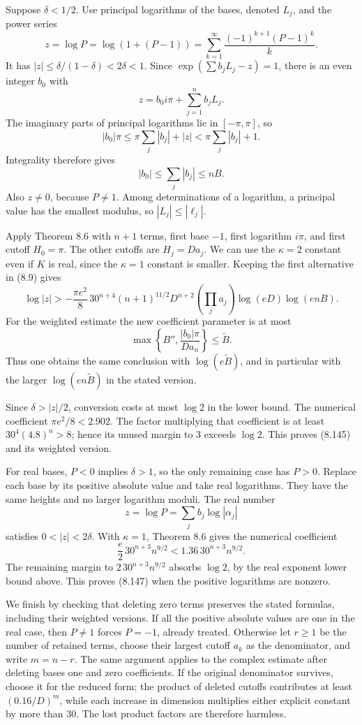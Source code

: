\documentclass[
  11pt,
  a4paper,
]{article}
\begin{document}
Suppose \(\delta<1/2\). Use principal logarithms of the bases, denoted
\(L_j\), and the power series \[
z=\log P=\log(1+(P-1))
=\sum_{k=1}^\infty\frac{(-1)^{k+1}(P-1)^k}{k}.
\] It has \(|z|\le\delta/(1-\delta)<2\delta<1\). Since
\(\exp(\sum b_jL_j-z)=1\), there is an even integer \(b_0\) with \[
z=b_0i\pi+\sum_{j=1}^n b_jL_j.
\] The imaginary parts of principal logarithms lie in \([-\pi,\pi]\), so
\[
|b_0|\pi\le\pi\sum_j|b_j|+|z|
<\pi\sum_j|b_j|+1.
\] Integrality therefore gives \[
|b_0|\le\sum_j|b_j|\le nB. \tag{8.148}
\] Also \(z\ne0\), because \(P\ne1\). Among determinations of a
logarithm, a principal value has the smallest modulus, so
\(|L_j|\le|\ell_j|\).

Apply Theorem 8.6 with \(n+1\) terms, first base \(-1\), first logarithm
\(i\pi\), and first cutoff \(H_0=\pi\). The other cutoffs are
\(H_j=D a_j\). We can use the \(\kappa=2\) constant even if \(K\) is
real, since the \(\kappa=1\) constant is smaller. Keeping the first
alternative in (8.9) gives \[
\log|z|>
-\frac{\pi e^2}{8}\,
30^{n+4}(n+1)^{11/2}D^{n+2}
\left(\prod_j a_j\right)\log(eD)\log(enB).
\] For the weighted estimate the new coefficient parameter is at most \[
\max\left\{B'',\frac{|b_0|\pi}{D a_n}\right\}
\le\widetilde B.
\] Thus one obtains the same conclusion with \(\log(e\widetilde B)\),
and in particular with the larger \(\log(en\widetilde B)\) in the stated
version.

Since \(\delta>|z|/2\), conversion costs at most \(\log2\) in the lower
bound. The numerical coefficient \(\pi e^2/8<2.902\). The factor
multiplying that coefficient is at least \(30^4(4.8)^n>8\); hence its
unused margin to \(3\) exceeds \(\log2\). This proves (8.145) and its
weighted version.

For real bases, \(P<0\) implies \(\delta>1\), so the only remaining case
has \(P>0\). Replace each base by its positive absolute value and take
real logarithms. They have the same heights and no larger logarithm
moduli. The real number \[
z=\log P=\sum_j b_j\log|\alpha_j|
\] satisfies \(0<|z|<2\delta\). With \(\kappa=1\), Theorem 8.6 gives the
numerical coefficient \[
\frac e2\,30^{n+3}n^{9/2}<1.36\,30^{n+3}n^{9/2}.
\] The remaining margin to \(2\,30^{n+3}n^{9/2}\) absorbs \(\log2\), by
the real exponent lower bound above. This proves (8.147) when the
positive logarithms are nonzero.

We finish by checking that deleting zero terms preserves the stated
formulas, including their weighted versions. If all the positive
absolute values are one in the real case, then \(P\ne1\) forces
\(P=-1\), already treated. Otherwise let \(r\ge1\) be the number of
retained terms, choose their largest cutoff \(a_k\) as the denominator,
and write \(m=n-r\). The same argument applies to the complex estimate
after deleting bases one and zero coefficients. If the original
denominator survives, choose it for the reduced form; the product of
deleted cutoffs contributes at least \((0.16/D)^m\), while each increase
in dimension multiplies either explicit constant by more than \(30\).
The lost product factors are therefore harmless.
\end{document}
